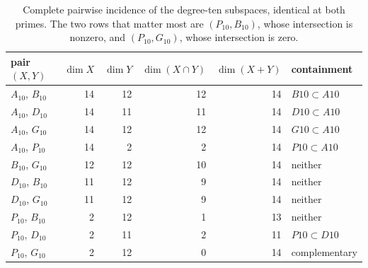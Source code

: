 \begin{table}[t]
\centering
\begin{tabular}{lrrrrl}
\toprule
pair $(X,Y)$ & $\dim X$ & $\dim Y$ & $\dim(X\cap Y)$ & $\dim(X+Y)$ & containment \\
\midrule
$A_{10}$, $B_{10}$ & 14 & 12 & 12 & 14 & $B10 \subset A10$ \\
$A_{10}$, $D_{10}$ & 14 & 11 & 11 & 14 & $D10 \subset A10$ \\
$A_{10}$, $G_{10}$ & 14 & 12 & 12 & 14 & $G10 \subset A10$ \\
$A_{10}$, $P_{10}$ & 14 & 2 & 2 & 14 & $P10 \subset A10$ \\
$B_{10}$, $G_{10}$ & 12 & 12 & 10 & 14 & neither \\
$D_{10}$, $B_{10}$ & 11 & 12 & 9 & 14 & neither \\
$D_{10}$, $G_{10}$ & 11 & 12 & 9 & 14 & neither \\
$P_{10}$, $B_{10}$ & 2 & 12 & 1 & 13 & neither \\
$P_{10}$, $D_{10}$ & 2 & 11 & 2 & 11 & $P10 \subset D10$ \\
$P_{10}$, $G_{10}$ & 2 & 12 & 0 & 14 & complementary \\
\bottomrule
\end{tabular}
\caption{Complete pairwise incidence of the degree-ten subspaces, identical at both primes. The two rows that matter most are $(P_{10},B_{10})$, whose intersection is nonzero, and $(P_{10},G_{10})$, whose intersection is zero.}
\label{tab:incidence}
\end{table}
